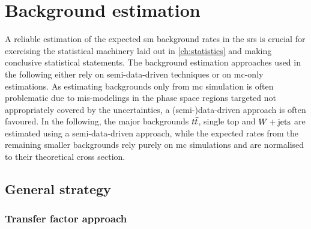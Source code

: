 

\chapter{Background estimation}\label{ch:background_estimation}

\ifpdf
    \graphicspath{{chapter-background/Figs/Raster/}{chapter-background/Figs/PDF/}{chapter-background/Figs/}}
\else
    \graphicspath{{chapter-background/Figs/Vector/}{chapter-background/Figs/}}
\fi


A reliable estimation of the expected \gls{sm} background rates in the \glspl{sr} is crucial for exercising the statistical machinery laid out in \cref{ch:statistics} and making conclusive statistical statements. The background estimation approaches used in the following either rely on semi-data-driven techniques or on \gls{mc}-only estimations. As estimating backgrounds only from \gls{mc} simulation is often problematic due to \eg mis-modelings in the phase space regions targeted not appropriately covered by the uncertainties, a (semi-)data-driven approach is often favoured. In the following, the major backgrounds $t\bar{t}$, single top and $W+\mathrm{jets}$ are estimated using a semi-data-driven approach, while the expected rates from the remaining smaller backgrounds rely purely on \gls{mc} simulations and are normalised to their theoretical cross section.

\section{General strategy}

\subsection{Transfer factor approach}

